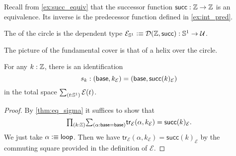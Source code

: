\begin{comment}
\begin{defn}\label{defn:fiber_sequence}
A \define{fiber sequence} 
\begin{equation*}
F \hookrightarrow E \twoheadrightarrow B
\end{equation*}
consists of a \define{base type} $B$ with a base point $b_0$ and a dependent type $P:B\to\type$, a type $F$ called the \define{fiber} with an equivalence $\eqv{P(b_0)}{F}$, and a type $E$ called the \define{total space} with a map $p:E\to B$ and an equivalence $e:\eqv{(\sm{b:B}P(b))}{E}$ such that the triangle
\begin{equation*}
\begin{tikzcd}
\Big(\sm{b:B}P(b)\Big) \arrow[rr,"e"] \arrow[dr,swap,"\proj 1"] & & E \arrow[dl,"p"] \\
& B
\end{tikzcd}
\end{equation*}
commutes.
\end{defn}
\end{comment}

Recall from \cref{ex:succ_equiv} that the successor function $\mathsf{succ}:\mathbb{Z}\to \mathbb{Z}$ is an equivalence. Its inverse is the predecessor function defined in \cref{ex:int_pred}. 

\begin{defn}
The  of the circle is the dependent type $\mathcal{E}_{\mathbb{S}^{1}}\vcentcolon\equiv\mathcal{D}(\mathbb{Z},\mathsf{succ}):\mathbb{S}^{1}\to\mathcal{U}$.
\end{defn}

The picture of the fundamental cover is that of a helix over the circle.

\begin{lem}
For any $k:\mathbb{Z}$, there is an identification
\begin{equation*}
s_k:(\mathsf{base},k_{\mathcal{E}})=(\mathsf{base},\mathsf{succ}(k)_{\mathcal{E}})
\end{equation*}
in the total space $\sm{t:\sphere{1}}\mathcal{E}(t)$.
\end{lem}

\begin{proof}
By \cref{thm:eq_sigma} it suffices to show that
\begin{equation*}
\prd{k:\Z} \sm{\alpha:\base=\base} \mathsf{tr}_{\mathcal{E}}(\alpha,k_{\mathcal{E}})= \mathsf{succ}(k)_{\mathcal{E}}.
\end{equation*}
We just take $\alpha\vcentcolon\equiv\mathsf{loop}$. Then we have $\mathsf{tr}_{\mathcal{E}}(\alpha,k_{\mathcal{E}})= \mathsf{succ}(k)_{\mathcal{E}}$ by the commuting square provided in the definition of $\mathcal{E}$.
\end{proof}


